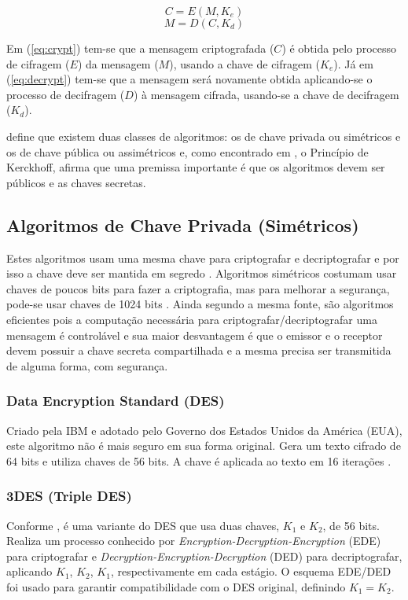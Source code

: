 \documentclass[12px,a4paper,twoside]{article}
\begin{document}
\begin{equation}
\label{eq:crypt}
    C = E(M, K_e)
\end{equation}
\begin{equation}
\label{eq:decrypt}
    M = D(C, K_d)
\end{equation}

Em (\ref{eq:crypt}) tem-se que a mensagem criptografada ($C$) é obtida pelo
processo de cifragem ($E$) da mensagem ($M$), usando a chave de cifragem
($K_e$).  Já em (\ref{eq:decrypt}) tem-se que a mensagem será novamente obtida
aplicando-se o processo de decifragem ($D$) à mensagem cifrada, usando-se a
chave de decifragem ($K_d$).

\cite{uchoa} define que existem duas classes de algoritmos: os de chave privada
ou simétricos e os de chave pública ou assimétricos e, como encontrado em
\cite{tanenbaum}, o Princípio de Kerckhoff, afirma que uma premissa importante
é que os algoritmos devem ser públicos e as chaves secretas.

\subsection{Algoritmos de Chave Privada (Simétricos)}
\label{sec:teoria:simetricos}
Estes algoritmos usam uma mesma chave para criptografar e decriptografar e por
isso a chave deve ser mantida em segredo \cite{uchoa}.  Algoritmos simétricos
costumam usar chaves de poucos bits para fazer a criptografia, mas para
melhorar a segurança, pode-se usar chaves de 1024 bits \cite{tanenbaum:1}.
Ainda segundo a mesma fonte, são algoritmos eficientes pois a computação
necessária para criptografar/decriptografar uma mensagem é controlável e sua
maior desvantagem é que o emissor e o receptor devem possuir a chave secreta
compartilhada e a mesma precisa ser transmitida de alguma forma, com segurança.

\subsubsection{Data Encryption Standard (DES)}
\label{sec:teoria:simetricos:des}
Criado pela IBM e adotado pelo Governo dos Estados Unidos da América (EUA),
este algoritmo não é mais seguro em sua forma original.  Gera um texto cifrado
de 64 bits e utiliza chaves de 56 bits.  A chave é aplicada ao texto em 16
iterações \cite{tanenbaum}.

\subsubsection{3DES (Triple DES)}
\label{sec:teoria:simetricos:3des}
Conforme \cite{tanenbaum}, é uma variante do DES que usa duas chaves, $K_1$ e
$K_2$, de 56 bits. Realiza um processo conhecido por
\textit{Encryption-Decryption-Encryption} (EDE) para criptografar e
\textit{Decryption-Encryption-Decryption} (DED) para decriptografar, aplicando
$K_1$, $K_2$, $K_1$, respectivamente em cada estágio.  O esquema EDE/DED foi
usado para garantir compatibilidade com o DES original, definindo $K_1 = K_2$.
\end{document}
